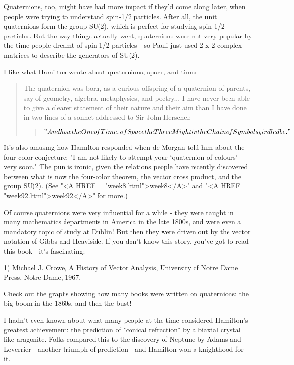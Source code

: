 Quaternions, too, might have had more impact if they'd come along later,
when people were trying to understand spin-1/2 particles.  After all, 
the unit quaternions form the group SU(2), which is perfect for studying
spin-1/2 particles.   But the way things actually went, quaternions were 
not very popular by the time people dreamt of spin-1/2 particles - so 
Pauli just used 2 x 2 complex matrices to describe the generators of SU(2).   

I like what Hamilton wrote about quaternions, space, and time:

\begin{quote}
    The quaternion was born, as a curious offspring of a quaternion
    of parents, say of geometry, algebra, metaphysics, and poetry... 
    I have never been able to give a clearer statement of their nature
    and their aim than I have done in two lines of a sonnet addressed
    to Sir John Herschel: 
\begin{quote}

$$

           "And how the One of Time, of Space the Three
            Might in the Chain of Symbols girdled be."
$$
    
\end{quote}
\end{quote}

It's also amusing how Hamilton responded when de Morgan told him about
the four-color conjecture: "I am not likely to attempt your
`quaternion of colours' very soon." The pun is ironic, given the
relations people have recently discovered between what is now the
four-color theorem, the vector cross product, and the group SU(2).  (See
"<A HREF = "week8.html">week8</A>" and "<A HREF =
"week92.html">week92</A>" for more.)

Of course quaternions were very influential for a while - they were taught 
in many mathematics departments in America in the late 1800s, and were 
even a mandatory topic of study at Dublin!  But then they were driven 
out by the vector notation of Gibbs and Heaviside.  If you don't know 
this story, you've got to read this book - it's fascinating:

1) Michael J. Crowe, A History of Vector Analysis, University of Notre 
Dame Press, Notre Dame, 1967.

Check out the graphs showing how many books were written on quaternions:
the big boom in the 1860s, and then the bust!

I hadn't even known about what many people at the time considered
Hamilton's greatest achievement: the prediction of "conical
refraction" by a biaxial crystal like aragonite.  Folks compared
this to the discovery of Neptune by Adams and Leverrier - another
triumph of prediction - and Hamilton won a knighthood for it.

